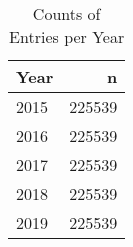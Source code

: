 \documentclass[
]{article}
\newenvironment{Shaded}{\begin{snugshade}}{\end{snugshade}}
\newcommand{\DataTypeTok}[1]{\textcolor[rgb]{0.13,0.29,0.53}{#1}}
\newcommand{\KeywordTok}[1]{\textcolor[rgb]{0.13,0.29,0.53}{\textbf{#1}}}
\newcommand{\NormalTok}[1]{#1}
\newcommand{\OperatorTok}[1]{\textcolor[rgb]{0.81,0.36,0.00}{\textbf{#1}}}
\newcommand{\StringTok}[1]{\textcolor[rgb]{0.31,0.60,0.02}{#1}}
\begin{document}
\begin{table}

\caption{\label{tab:unnamed-chunk-5}Counts of Entries per Year}
\centering
\begin{tabular}[t]{l|r}
\hline
Year & n\\
\hline
2015 & 225539\\
\hline
2016 & 225539\\
\hline
2017 & 225539\\
\hline
2018 & 225539\\
\hline
2019 & 225539\\
\hline
\end{tabular}
\end{table}

\begin{Shaded}
\end{Shaded}
\end{document}
